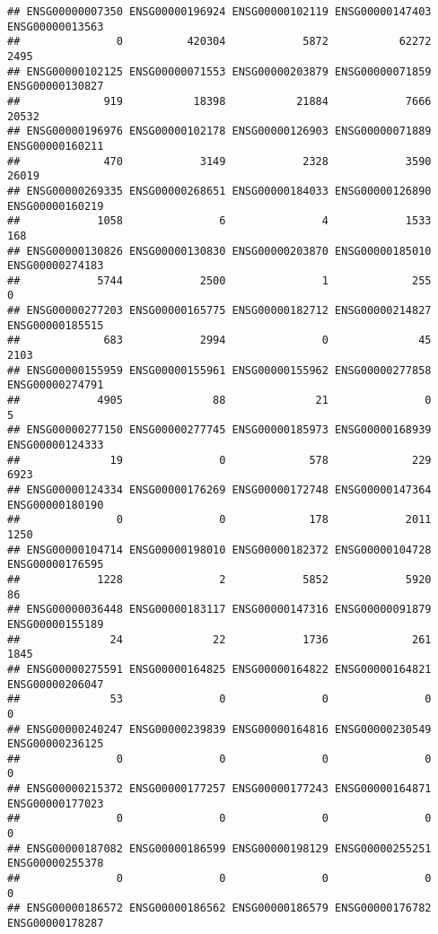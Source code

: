 \documentclass[
]{article}
\begin{document}
\begin{verbatim}
## ENSG00000007350 ENSG00000196924 ENSG00000102119 ENSG00000147403 ENSG00000013563 
##               0          420304            5872           62272            2495 
## ENSG00000102125 ENSG00000071553 ENSG00000203879 ENSG00000071859 ENSG00000130827 
##             919           18398           21884            7666           20532 
## ENSG00000196976 ENSG00000102178 ENSG00000126903 ENSG00000071889 ENSG00000160211 
##             470            3149            2328            3590           26019 
## ENSG00000269335 ENSG00000268651 ENSG00000184033 ENSG00000126890 ENSG00000160219 
##            1058               6               4            1533             168 
## ENSG00000130826 ENSG00000130830 ENSG00000203870 ENSG00000185010 ENSG00000274183 
##            5744            2500               1             255               0 
## ENSG00000277203 ENSG00000165775 ENSG00000182712 ENSG00000214827 ENSG00000185515 
##             683            2994               0              45            2103 
## ENSG00000155959 ENSG00000155961 ENSG00000155962 ENSG00000277858 ENSG00000274791 
##            4905              88              21               0               5 
## ENSG00000277150 ENSG00000277745 ENSG00000185973 ENSG00000168939 ENSG00000124333 
##              19               0             578             229            6923 
## ENSG00000124334 ENSG00000176269 ENSG00000172748 ENSG00000147364 ENSG00000180190 
##               0               0             178            2011            1250 
## ENSG00000104714 ENSG00000198010 ENSG00000182372 ENSG00000104728 ENSG00000176595 
##            1228               2            5852            5920              86 
## ENSG00000036448 ENSG00000183117 ENSG00000147316 ENSG00000091879 ENSG00000155189 
##              24              22            1736             261            1845 
## ENSG00000275591 ENSG00000164825 ENSG00000164822 ENSG00000164821 ENSG00000206047 
##              53               0               0               0               0 
## ENSG00000240247 ENSG00000239839 ENSG00000164816 ENSG00000230549 ENSG00000236125 
##               0               0               0               0               0 
## ENSG00000215372 ENSG00000177257 ENSG00000177243 ENSG00000164871 ENSG00000177023 
##               0               0               0               0               0 
## ENSG00000187082 ENSG00000186599 ENSG00000198129 ENSG00000255251 ENSG00000255378 
##               0               0               0               0               0 
## ENSG00000186572 ENSG00000186562 ENSG00000186579 ENSG00000176782 ENSG00000178287 

\end{verbatim}
\end{document}

